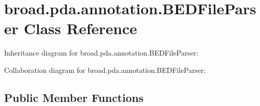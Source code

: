 \hypertarget{classbroad_1_1pda_1_1annotation_1_1_b_e_d_file_parser}{\section{broad.\+pda.\+annotation.\+B\+E\+D\+File\+Parser Class Reference}
\label{classbroad_1_1pda_1_1annotation_1_1_b_e_d_file_parser}
}


Inheritance diagram for broad.\+pda.\+annotation.\+B\+E\+D\+File\+Parser\+:


Collaboration diagram for broad.\+pda.\+annotation.\+B\+E\+D\+File\+Parser\+:
\subsection*{Public Member Functions}
